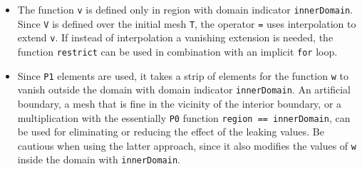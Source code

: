 \documentclass[9pt]{amsart}
\theoremstyle{remark}
\theoremstyle{definition}
\begin{document}
\begin{itemize}
\item The function \verb!v! is defined only in region with domain indicator \verb!innerDomain!. Since \verb!V! is defined over the initial mesh \verb!T!, the operator \verb!=! uses interpolation to extend \verb!v!. If instead of interpolation a vanishing extension is needed, the function \verb!restrict! can be used in combination with an implicit \verb!for! loop.
\item Since \verb!P1! elements are used, it takes a strip of elements for the function \verb!w! to vanish outside the domain with domain indicator \verb!innerDomain!. An artificial boundary, a mesh that is fine in the vicinity of the interior boundary, or a multiplication with the essentially \verb!P0! function \verb!region == innerDomain!, can be used for eliminating or reducing the effect of the leaking values. Be cautious when using the latter approach, since it also modifies the values of \verb!w! inside the domain with \verb!innerDomain!.
\end{itemize}
\end{document}
